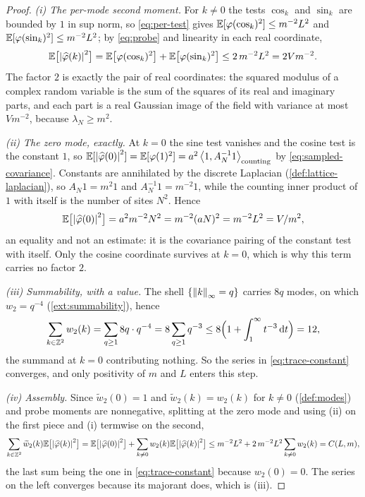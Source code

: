 \begin{proof}
\emph{(i) The per-mode second moment.} For $k\ne0$ the tests $\cos_k$ and
$\sin_k$ are bounded by $1$ in sup norm, so \eqref{eq:per-test} gives
$\mathbb{E}[\varphi(\cos_k)^2]\le m^{-2}L^{2}$ and
$\mathbb{E}[\varphi(\sin_k)^2]\le m^{-2}L^{2}$; by \eqref{eq:probe} and linearity
in each real coordinate,
\[
  \mathbb{E}\bigl[\left| \widehat\varphi(k) \right|^{2}\bigr]
  =\mathbb{E}\bigl[\varphi(\cos_k)^2\bigr]+\mathbb{E}\bigl[\varphi(\sin_k)^2\bigr]
  \le 2\,m^{-2}L^{2}=2Vm^{-2}.
\]
The factor $2$ is exactly the pair of real coordinates: the squared modulus
of a complex random variable is the sum of the squares of its real and
imaginary parts, and each part is a real Gaussian image of the field with
variance at most $Vm^{-2}$, because $\lambda_N\ge m^{2}$.

\emph{(ii) The zero mode, exactly.} At $k=0$ the sine test vanishes and the
cosine test is the constant $1$, so
$\mathbb{E}[\left| \widehat\varphi(0) \right|^{2}]=\mathbb{E}[\varphi(1)^2]
=a^{2}\left\langle 1, A_N^{-1}1 \right\rangle_{\mathrm{counting}}$ by \eqref{eq:sampled-covariance}.
Constants are annihilated by the discrete Laplacian
(\cref{def:lattice-laplacian}), so $A_N1=m^{2}1$ and $A_N^{-1}1=m^{-2}1$,
while the counting inner product of $1$ with itself is the number of sites
$N^{2}$. Hence
\[
  \mathbb{E}\bigl[\left| \widehat\varphi(0) \right|^{2}\bigr]
  =a^{2}m^{-2}N^{2}=m^{-2}(aN)^{2}=m^{-2}L^{2}=V/m^{2},
\]
an equality and not an estimate: it is the covariance pairing of the
constant test with itself. Only the cosine coordinate survives at $k=0$,
which is why this term carries no factor $2$.

\emph{(iii) Summability, with a value.} The shell
$\{\left\| k \right\|_\infty=q\}$ carries $8q$ modes, on which $w_2=q^{-4}$
(\cref{ext:summability}), hence
\[
  \sum_{k\in\mathbb{Z}^2}w_2(k)=\sum_{q\ge1}8q\cdot q^{-4}
  =8\sum_{q\ge1}q^{-3}
  \le 8\Bigl(1+\int_1^\infty t^{-3}\,\mathrm{d} t\Bigr)=12 ,
\]
the summand at $k=0$ contributing nothing. So the series in
\eqref{eq:trace-constant} converges, and only positivity of $m$ and $L$
enters this step.

\emph{(iv) Assembly.} Since $\widetilde w_2(0)=1$ and
$\widetilde w_2(k)=w_2(k)$ for $k\ne0$ (\cref{def:modes}) and probe moments
are nonnegative, splitting at the zero mode and using (ii) on the first
piece and (i) termwise on the second,
\[
  \sum_{k\in\mathbb{Z}^2}\widetilde w_2(k)\mathbb{E}\bigl[\left| \widehat\varphi(k) \right|^{2}\bigr]
  =\mathbb{E}\bigl[\left| \widehat\varphi(0) \right|^{2}\bigr]
   +\sum_{k\neq0}w_2(k)\mathbb{E}\bigl[\left| \widehat\varphi(k) \right|^{2}\bigr]
  \le m^{-2}L^{2}+2\,m^{-2}L^{2}\sum_{k\neq0}w_2(k)=C(L,m),
\]
the last sum being the one in \eqref{eq:trace-constant} because $w_2(0)=0$.
The series on the left converges because its majorant does, which is (iii).
\end{proof}

